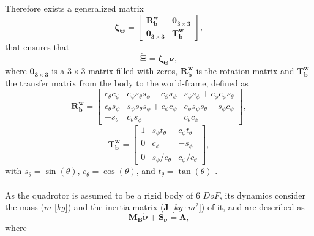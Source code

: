 Therefore exists a generalized matrix
\begin{equation}
\mathbf{\zeta_\Theta} = \begin{bmatrix}
\mathbf{R_{b}^{w}} & \mathbf{0_{3\times 3}} \\
\mathbf{0_{3\times 3}} & \mathbf{T_{b}^{w}}
\end{bmatrix},
\end{equation}
that ensures that
\begin{equation}
\mathbf{\dot{\Xi}} = \mathbf{\zeta_\Theta}\mathbf{\nu},
\end{equation}
where $\mathbf{0_{3\times 3}}$ is a $3\times 3$-matrix filled with zeros, $\mathbf{R_{b}^{w}}$ is the rotation matrix and $\mathbf{T_{b}^{w}}$ the transfer matrix from the body to the world-frame, defined as
\begin{equation}
\label{eqn:rotbw1}
\mathbf{R_{b}^{w}} = \begin{bmatrix}
c_\theta c_\psi & c_\psi s_\theta s_\phi-c_\phi s_\psi & s_\phi s_\psi+c_\phi c_\psi s_\theta\\
c_\theta s_\psi & s_\psi s_\theta s_\phi+c_\phi c_\psi & c_\phi s_\psi s_\theta - s_\phi c_\psi\\
-s_\theta & c_\theta s_\phi & c_\theta c_\phi
\end{bmatrix},
\end{equation}
\begin{equation}
\mathbf{T_{b}^{w}} = \begin{bmatrix}
1 & s_\phi t_\theta & c_\phi t_\theta\\
0 & c_\phi & -s_\phi\\
0 & s_\phi / c_\theta & c_\phi / c_\theta 
\end{bmatrix},
\end{equation}
with $s_\theta = \sin(\theta)$, $c_\theta = \cos(\theta)$, and $t_\theta = \tan(\theta)$ \cite{Bresciani2008}.
\\\\
As the quadrotor is assumed to be a rigid body of 6 $DoF$, its dynamics consider the mass ($m$ [$kg$]) and the inertia matrix ($\mathbf{J}$ [$kg\cdot m^{2}$]) of it, and are described as
\begin{equation}
\label{eqn:eomNewtonEuler}
\mathbf{M_{B}}\mathbf{\dot{\nu}} + \mathbf{S_\nu} = \mathbf{\Lambda},
\end{equation}
where
